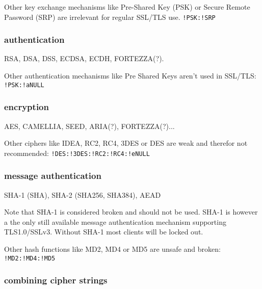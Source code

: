 Other key exchange mechanisms like Pre-Shared Key (PSK) or Secure Remote Password
(SRP) are irrelevant for regular SSL/TLS use. \texttt{!PSK:!SRP}

\subsubsection{authentication}

RSA, DSA, DSS, ECDSA, ECDH, FORTEZZA(?).

Other authentication mechanisms like Pre Shared Keys aren't used in SSL/TLS: \texttt{!PSK:!aNULL}

\subsubsection{encryption}

AES, CAMELLIA, SEED, ARIA(?), FORTEZZA(?)...

Other ciphers like IDEA, RC2, RC4, 3DES or DES are weak and therefor not recommended:
\texttt{!DES:!3DES:!RC2:!RC4:!eNULL}

\subsubsection{message authentication}

SHA-1 (SHA), SHA-2 (SHA256, SHA384), AEAD

Note that SHA-1 is considered broken and should not be used. SHA-1 is however a the
only still available message authentication mechanism supporting TLS1.0/SSLv3. Without
SHA-1 most clients will be locked out.

Other hash functions like MD2, MD4 or MD5 are unsafe and broken: \texttt{!MD2:!MD4:!MD5}

\subsubsection{combining cipher strings}


